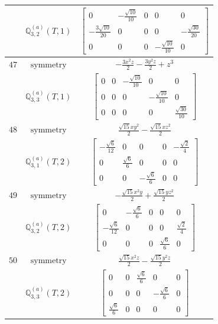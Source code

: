 \documentclass[fleqn,8pt,landscape]{jsarticle}
\begin{document}
\begin{longtable}{ccc}
$  $ & $ \mathbb{Q}_{3,2}^{(a)}(T,1) $ & $ \begin{bmatrix} 0 & - \frac{\sqrt{10}}{10} & 0 & 0 & 0 \\ - \frac{3 \sqrt{10}}{20} & 0 & 0 & 0 & - \frac{\sqrt{30}}{20} \\ 0 & 0 & 0 & - \frac{\sqrt{10}}{10} & 0 \end{bmatrix} $ \\ \hline
$ 47 $ & $ \text{symmetry} $ & $ - \frac{3 x^{2} z}{2} - \frac{3 y^{2} z}{2} + z^{3} $ \\
$  $ & $ \mathbb{Q}_{3,3}^{(a)}(T,1) $ & $ \begin{bmatrix} 0 & 0 & - \frac{\sqrt{10}}{10} & 0 & 0 \\ 0 & 0 & 0 & - \frac{\sqrt{10}}{10} & 0 \\ 0 & 0 & 0 & 0 & \frac{\sqrt{30}}{10} \end{bmatrix} $ \\ \hline
$ 48 $ & $ \text{symmetry} $ & $ \frac{\sqrt{15} x y^{2}}{2} - \frac{\sqrt{15} x z^{2}}{2} $ \\
$  $ & $ \mathbb{Q}_{3,1}^{(a)}(T,2) $ & $ \begin{bmatrix} - \frac{\sqrt{6}}{12} & 0 & 0 & 0 & - \frac{\sqrt{2}}{4} \\ 0 & \frac{\sqrt{6}}{6} & 0 & 0 & 0 \\ 0 & 0 & - \frac{\sqrt{6}}{6} & 0 & 0 \end{bmatrix} $ \\ \hline
$ 49 $ & $ \text{symmetry} $ & $ - \frac{\sqrt{15} x^{2} y}{2} + \frac{\sqrt{15} y z^{2}}{2} $ \\
$  $ & $ \mathbb{Q}_{3,2}^{(a)}(T,2) $ & $ \begin{bmatrix} 0 & - \frac{\sqrt{6}}{6} & 0 & 0 & 0 \\ - \frac{\sqrt{6}}{12} & 0 & 0 & 0 & \frac{\sqrt{2}}{4} \\ 0 & 0 & 0 & \frac{\sqrt{6}}{6} & 0 \end{bmatrix} $ \\ \hline
$ 50 $ & $ \text{symmetry} $ & $ \frac{\sqrt{15} x^{2} z}{2} - \frac{\sqrt{15} y^{2} z}{2} $ \\
$  $ & $ \mathbb{Q}_{3,3}^{(a)}(T,2) $ & $ \begin{bmatrix} 0 & 0 & \frac{\sqrt{6}}{6} & 0 & 0 \\ 0 & 0 & 0 & - \frac{\sqrt{6}}{6} & 0 \\ \frac{\sqrt{6}}{6} & 0 & 0 & 0 & 0 \end{bmatrix} $ \\ \hline

\end{longtable}
\end{document}
